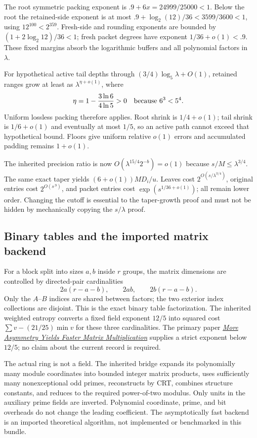 \documentclass[11pt,letterpaper]{article}
\theoremstyle{remark}\newtheorem{remark}[theorem]{Remark}
\begin{document}
The root symmetric packing exponent is $.9+6x=24999/25000<1$.
Below the root the retained-side exponent is at most
$.9+\log_2(12)/36<3599/3600<1$, using $12^{100}<2^{359}$.
Fresh-side and rounding exponents are bounded by
$(1+2\log_2 12)/36<1$; fresh packet degrees have exponent
$1/36+o(1)<.9$. These fixed margins absorb the logarithmic buffers and
all polynomial factors in $\lambda$.

For hypothetical active tail depths through
$(3/4)\log_5\lambda+O(1)$, retained ranges grow at least as
$\lambda^{\eta+o(1)}$, where
\[
 \eta=1-\frac{3\ln6}{4\ln5}>0\quad\hbox{because }6^3<5^4.
\]
Uniform lossless packing therefore applies. Root shrink is $1/4+o(1)$;
tail shrink is $1/6+o(1)$ and eventually at most $1/5$, so an active path
cannot exceed that hypothetical bound. Floors give uniform relative $o(1)$
errors and accumulated padding remains $1+o(1)$.

The inherited precision ratio is now
$O(\lambda^{15/4}2^{-b})=o(1)$ because $s/M\le\lambda^{3/4}$.
The same exact taper yields $(6+o(1))MD_i/u$. Leaves cost
$2^{O(s/\lambda^{3/4})}$, original entries cost $2^{O(s^{.9})}$, and
packet entries cost $\exp(s^{1/36+o(1)})$; all remain lower order.
Changing the cutoff is essential to the taper-growth proof and must not
be hidden by mechanically copying the $s/\lambda$ proof.

\subsection{Binary tables and the imported matrix backend}
For a block split into sizes $a,b$ inside $r$ groups, the matrix dimensions
are controlled by directed-pair cardinalities
\[
 2a(r-a-b),\qquad 2ab,\qquad 2b(r-a-b).
\]
Only the $A$--$B$ indices are shared between factors; the two exterior index
collections are disjoint. This is the exact binary table factorization.
The inherited weighted entropy converts a fixed field exponent $12/5$ into
squared cost $\sum v-(21/25)\min v$ for these three cardinalities.
The primary paper \href{https://arxiv.org/abs/2404.16349}{\emph{More Asymmetry
Yields Faster Matrix Multiplication}} supplies a strict exponent below $12/5$;
no claim about the current record is required.

The actual ring is not a field. The inherited bridge expands its polynomially
many module coordinates into bounded integer matrix products, uses sufficiently
many nonexceptional odd primes, reconstructs by CRT, combines structure constants,
and reduces to the required power-of-two modulus. Only units in the auxiliary
prime fields are inverted. Polynomial coordinate, prime, and bit overheads do
not change the leading coefficient. The asymptotically fast backend is an
imported theoretical algorithm, not implemented or benchmarked in this bundle.
\end{document}
